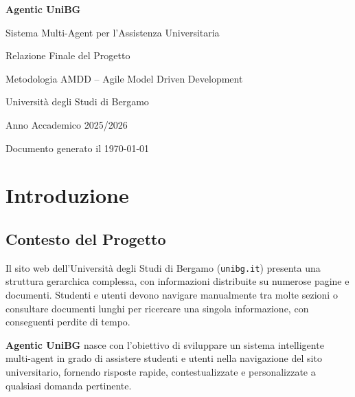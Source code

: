 \documentclass[a4paper,12pt]{report}
\begin{document}
\begin{titlepage}
\centering
\vspace*{2cm}

{\Huge\bfseries Agentic UniBG\par}
\vspace{0.5cm}
{\Large Sistema Multi-Agent per l'Assistenza Universitaria\par}
\vspace{1.5cm}
{\large Relazione Finale del Progetto\par}
\vspace{0.5cm}
{\large Metodologia AMDD -- Agile Model Driven Development\par}
\vspace{3cm}

{\large Università degli Studi di Bergamo\par}
\vspace{0.5cm}
{\large Anno Accademico 2025/2026\par}

\vfill
{\small Documento generato il \today\par}
\end{titlepage}

\tableofcontents
\newpage

\chapter{Introduzione}

\section{Contesto del Progetto}

Il sito web dell'Università degli Studi di Bergamo (\texttt{unibg.it}) presenta una struttura gerarchica complessa, con informazioni distribuite su numerose pagine e documenti. Studenti e utenti devono navigare manualmente tra molte sezioni o consultare documenti lunghi per ricercare una singola informazione, con conseguenti perdite di tempo.

\textbf{Agentic UniBG} nasce con l'obiettivo di sviluppare un sistema intelligente multi-agent in grado di assistere studenti e utenti nella navigazione del sito universitario, fornendo risposte rapide, contestualizzate e personalizzate a qualsiasi domanda pertinente.
\end{document}
